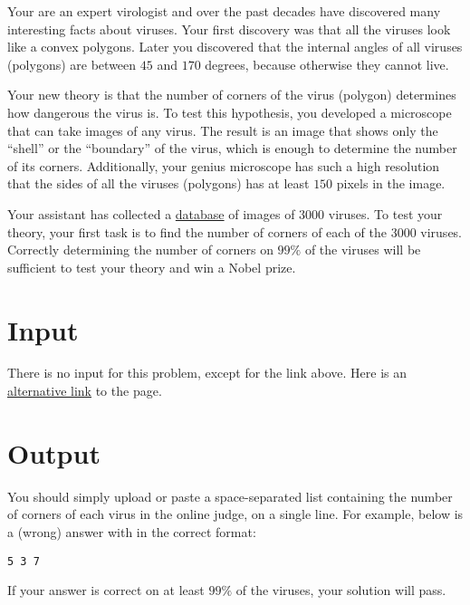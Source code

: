 Your are an expert virologist and over the past decades have discovered many interesting facts about viruses.
Your first discovery was that all the viruses look like a convex polygons.
Later you discovered that the internal angles of all viruses (polygons) are between $45$ and $170$ degrees, because otherwise they cannot live.

Your new theory is that the number of corners of the virus (polygon) determines how dangerous the virus is.
To test this hypothesis, you developed a microscope that can take images of any virus.
The result is an image that shows only the ``shell'' or the ``boundary'' of the virus, which is enough to determine the number of its corners.
Additionally, your genius microscope has such a high resolution that the sides of all the viruses (polygons) has at least $150$ pixels in the image.

Your assistant has collected a \href{http://ejudge.rau.am/ejudge/virus-shapes.zip}{database} of images of $3000$ viruses.
To test your theory, your first task is to find the number of corners of each of the $3000$ viruses.
Correctly determining the number of corners on $99\%$ of the viruses will be sufficient to test your theory and win a Nobel prize.

\section*{Input}
There is no input for this problem, except for the link above.
Here is an \href{http://167.71.248.201/ejudge/virus-shapes.zip}{alternative link} to the page.

\section*{Output}
You should simply upload or paste a space-separated list containing the number of corners of each virus in the online judge, on a single line.
For example, below is a (wrong) answer with in the correct format:
\begin{center}
    \texttt{5 3 7}
\end{center}
If your answer is correct on at least $99\%$ of the viruses, your solution will pass.

%
%
%

